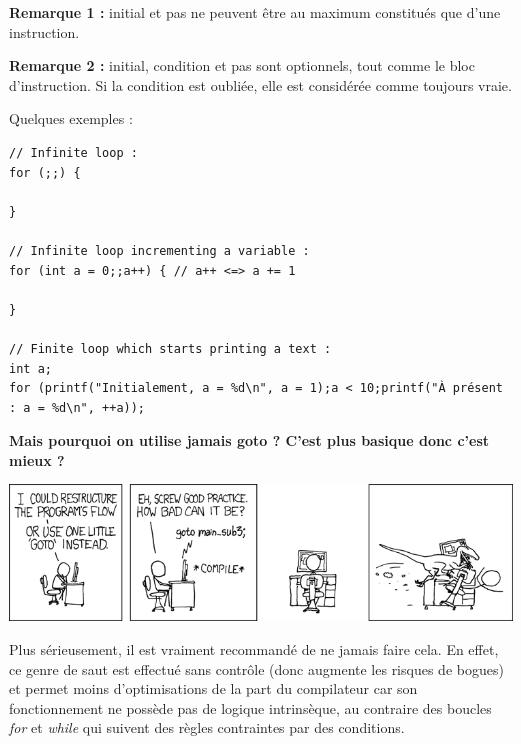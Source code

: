 \documentclass[../../../main.tex]{subfiles}
\begin{document}
\textbf{Remarque 1 :} \textsf{initial} et \textsf{pas} ne peuvent être au maximum constitués que d'une instruction.
 
\textbf{Remarque 2 :} \textsf{initial}, \textsf{condition} et \textsf{pas} sont optionnels, tout comme le bloc d'instruction. Si la condition est oubliée, elle est considérée comme toujours vraie.
 
Quelques exemples :
\begin{verbatim}
// Infinite loop :
for (;;) {
	
}

// Infinite loop incrementing a variable :
for (int a = 0;;a++) { // a++ <=> a += 1
	
}

// Finite loop which starts printing a text :
int a;
for (printf("Initialement, a = %d\n", a = 1);a < 10;printf("À présent : a = %d\n", ++a));
\end{verbatim}
\textbf{Mais pourquoi on utilise jamais \textsf{goto} ? C'est plus basique donc c'est mieux ?}
 
\begin{minipage}{\textwidth}
	\begin{center}
		\includegraphics[width=\textwidth]{meme2}
	\end{center}
\end{minipage}
 
Plus sérieusement, il est vraiment recommandé de ne jamais faire cela. En effet, ce genre de saut est effectué sans contrôle (donc augmente les risques de bogues) et permet moins d'optimisations de la part du compilateur car son fonctionnement ne possède pas de logique intrinsèque, au contraire des boucles \textit{for} et \textit{while} qui suivent des règles contraintes par des conditions.
\end{document}
